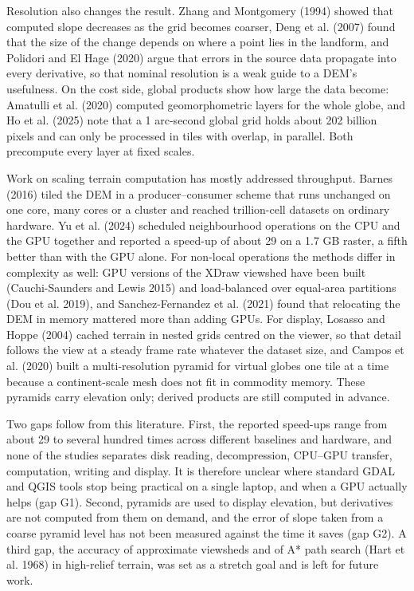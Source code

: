 \documentclass[10pt,a4paper]{article}
\begin{document}
Resolution also changes the result. Zhang and Montgomery (1994) showed that computed slope decreases as the grid becomes coarser, Deng et al. (2007) found that the size of the change depends on where a point lies in the landform, and Polidori and El Hage (2020) argue that errors in the source data propagate into every derivative, so that nominal resolution is a weak guide to a DEM's usefulness. On the cost side, global products show how large the data become: Amatulli et al. (2020) computed geomorphometric layers for the whole globe, and Ho et al. (2025) note that a 1 arc-second global grid holds about 202 billion pixels and can only be processed in tiles with overlap, in parallel. Both precompute every layer at fixed scales.

Work on scaling terrain computation has mostly addressed throughput. Barnes (2016) tiled the DEM in a producer--consumer scheme that runs unchanged on one core, many cores or a cluster and reached trillion-cell datasets on ordinary hardware. Yu et al. (2024) scheduled neighbourhood operations on the CPU and the GPU together and reported a speed-up of about 29 on a 1.7 GB raster, a fifth better than with the GPU alone. For non-local operations the methods differ in complexity as well: GPU versions of the XDraw viewshed have been built (Cauchi-Saunders and Lewis 2015) and load-balanced over equal-area partitions (Dou et al. 2019), and Sanchez-Fernandez et al. (2021) found that relocating the DEM in memory mattered more than adding GPUs. For display, Losasso and Hoppe (2004) cached terrain in nested grids centred on the viewer, so that detail follows the view at a steady frame rate whatever the dataset size, and Campos et al. (2020) built a multi-resolution pyramid for virtual globes one tile at a time because a continent-scale mesh does not fit in commodity memory. These pyramids carry elevation only; derived products are still computed in advance.

Two gaps follow from this literature. First, the reported speed-ups range from about 29 to several hundred times across different baselines and hardware, and none of the studies separates disk reading, decompression, CPU--GPU transfer, computation, writing and display. It is therefore unclear where standard GDAL and QGIS tools stop being practical on a single laptop, and when a GPU actually helps (gap G1). Second, pyramids are used to display elevation, but derivatives are not computed from them on demand, and the error of slope taken from a coarse pyramid level has not been measured against the time it saves (gap G2). A third gap, the accuracy of approximate viewsheds and of A* path search (Hart et al. 1968) in high-relief terrain, was set as a stretch goal and is left for future work.
\end{document}
